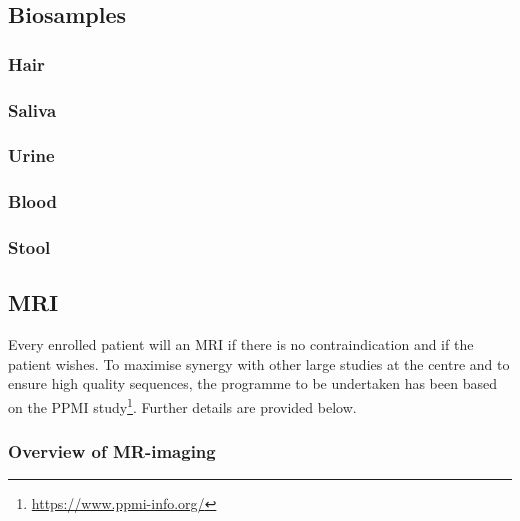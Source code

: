 \subsection{Biosamples}
\label{subsec:biosamples}
\subsubsection{Hair}
\label{biosamples:hair}
\subsubsection{Saliva}
\label{biosamples:saliva}
\subsubsection{Urine}
\label{biosamples:urine}
\subsubsection{Blood}
\label{biosamples:blood}
\subsubsection{Stool}
\label{biosamples:stool}


\subsection{\ac{MRI}}
\label{subsec:MRI}
Every enrolled patient will an \ac{MRI} if there is no contraindication and if the patient wishes. To maximise synergy with other large studies at the centre and to ensure high quality sequences, the programme to be undertaken has been based on the PPMI study\footnote{\url{https://www.ppmi-info.org/}}. Further details are provided below.
\subsubsection{Overview of MR-imaging}

